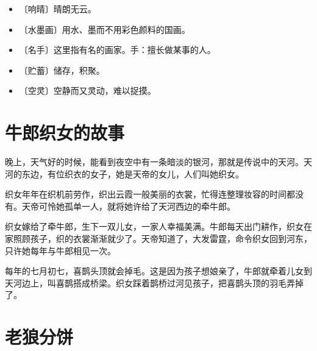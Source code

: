 \documentclass[12pt,UTF-8,openany]{ctexbook}
\begin{document}
\begin{itemize}
    \setlength\itemsep{-0.2em}
    \item 〔响晴〕晴朗无云。
    \item 〔水墨画〕用水、墨而不用彩色颜料的国画。
    \item 〔名手〕这里指有名的画家。手：擅长做某事的人。
    \item 〔贮蓄〕储存，积聚。
    \item 〔空灵〕空静而又灵动，难以捉摸。
\end{itemize}

\chapter{牛郎织女的故事}

\begin{large}
    
    晚上，天气好的时候，能看到夜空中有一条暗淡的银河，那就是传说中的天河。天河的东边，有位织衣的女子，她是天帝的女儿，人们叫她织女。
    
    织女年年在织机前劳作，织出云霞一般美丽的衣裳，忙得连整理妆容的时间都没有。天帝可怜她孤单一人，就将她许给了天河西边的牵牛郎。
    
    织女嫁给了牵牛郎，生下一双儿女，一家人幸福美满。牛郎每天出门耕作，织女在家照顾孩子，织的衣裳渐渐就少了。天帝知道了，大发雷霆，命令织女回到河东，只许她每年与牛郎相见一次。
    
    每年的七月初七，喜鹊头顶就会掉毛。这是因为孩子想娘亲了，牛郎就牵着儿女到天河边上，叫喜鹊搭成桥梁。织女踩着鹊桥过河见孩子，把喜鹊头顶的羽毛弄掉了。
    
\end{large}



\chapter{老狼分饼}
\end{document}
